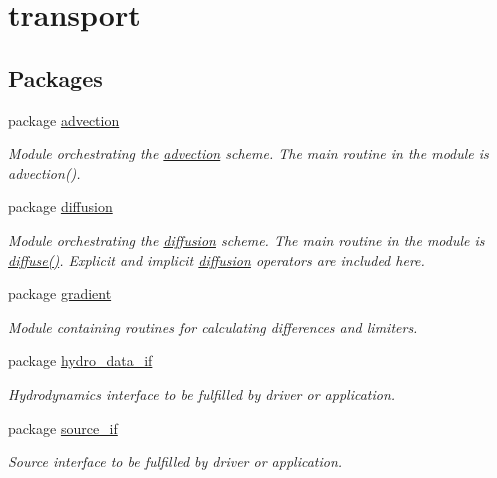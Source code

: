 \hypertarget{a00046}{
\section{transport}
\label{a00046}
}
\subsection*{Packages}
\begin{CompactItemize}
\item 
package \hyperlink{a00026}{advection}
\begin{CompactList}\small\item\em Module orchestrating the \hyperlink{a00026}{advection} scheme. The main routine in the module is advection(). \item\end{CompactList}

\item 
package \hyperlink{a00027}{diffusion}
\begin{CompactList}\small\item\em Module orchestrating the \hyperlink{a00027}{diffusion} scheme. The main routine in the module is \hyperlink{a00027_1d88a1781a952a596470deaf3506b476}{diffuse()}. Explicit and implicit \hyperlink{a00027}{diffusion} operators are included here. \item\end{CompactList}

\item 
package \hyperlink{a00033}{gradient}
\begin{CompactList}\small\item\em Module containing routines for calculating differences and limiters. \item\end{CompactList}

\item 
package \hyperlink{a00034}{hydro\_\-data\_\-if}
\begin{CompactList}\small\item\em Hydrodynamics interface to be fulfilled by driver or application. \item\end{CompactList}

\item 
package \hyperlink{a00036}{source\_\-if}
\begin{CompactList}\small\item\em Source interface to be fulfilled by driver or application. \item\end{CompactList}


\end{CompactItemize}
